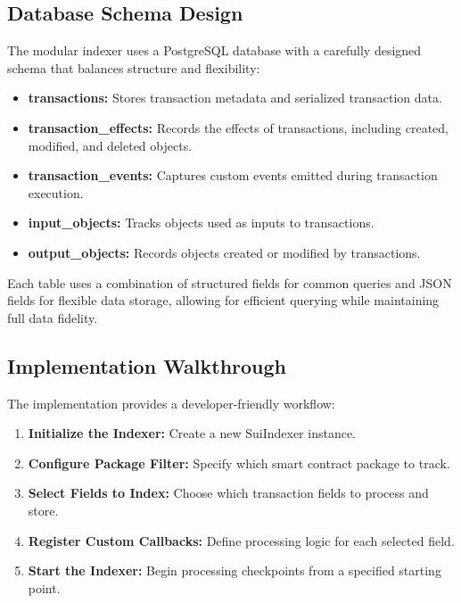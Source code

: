 \subsection{Database Schema Design}

The modular indexer uses a PostgreSQL database with a carefully designed schema that balances structure and flexibility:

\begin{itemize}
    \item \textbf{transactions:} Stores transaction metadata and serialized transaction data.
    \item \textbf{transaction\_effects:} Records the effects of transactions, including created, modified, and deleted objects.
    \item \textbf{transaction\_events:} Captures custom events emitted during transaction execution.
    \item \textbf{input\_objects:} Tracks objects used as inputs to transactions.
    \item \textbf{output\_objects:} Records objects created or modified by transactions.
\end{itemize}

Each table uses a combination of structured fields for common queries and JSON fields for flexible data storage, allowing for efficient querying while maintaining full data fidelity.

\subsection{Implementation Walkthrough}

The implementation provides a developer-friendly workflow:

\begin{enumerate}
    \item \textbf{Initialize the Indexer:} Create a new SuiIndexer instance.
    \item \textbf{Configure Package Filter:} Specify which smart contract package to track.
    \item \textbf{Select Fields to Index:} Choose which transaction fields to process and store.
    \item \textbf{Register Custom Callbacks:} Define processing logic for each selected field.
    \item \textbf{Start the Indexer:} Begin processing checkpoints from a specified starting point.
\end{enumerate}

